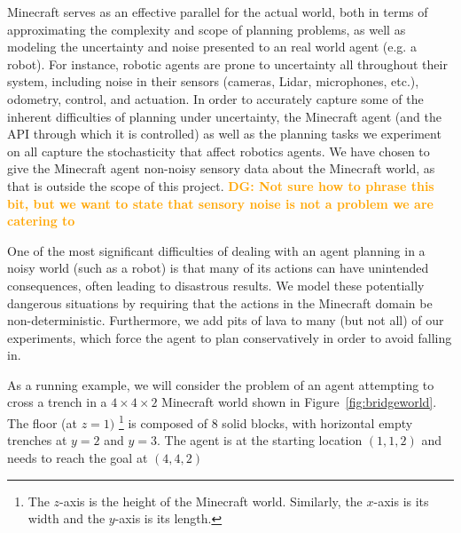\documentclass[]{article}
\newcommand{\dgnote}[1]{\textcolor{Orange}{\textbf{DG: #1}}}
\begin{document}
Minecraft serves as an effective parallel for the actual world, both in terms of
approximating the complexity and scope of planning problems,
as well as modeling the uncertainty and noise presented to an real world agent (e.g. a robot).
For instance, robotic agents are prone to uncertainty all throughout their system, including noise in their sensors
(cameras, Lidar, microphones, etc.), odometry, control, and actuation.
In order to accurately capture some of the inherent difficulties of planning under
uncertainty, the Minecraft agent (and the API through which it is controlled) as well as
the planning tasks we experiment on all capture the stochasticity that affect robotics agents.
We have chosen to give the Minecraft agent non-noisy sensory 
data about the Minecraft world, as that is outside the scope of this project. \dgnote{Not sure how to phrase this bit,
but we want to state that sensory noise is not a problem we are catering to}

One of the most significant difficulties of dealing with an agent planning in a noisy world (such as a robot) is that many of its actions
can have unintended consequences, often leading to disastrous results. We
model these potentially dangerous situations by requiring that the actions in the
Minecraft domain be non-deterministic. Furthermore, we add pits of lava to many (but not all)
of our experiments, which force the agent to plan conservatively in order to avoid
falling in.

As a running example, we will consider the problem of an agent attempting
to cross a trench in a $4 \times 4 \times 2$ Minecraft world shown in
Figure~\ref{fig:bridgeworld}. The floor (at $z = 1)$ \footnote{The
  $z$-axis is the height of the Minecraft world. Similarly, the
  $x$-axis is its width and the $y$-axis is its length.} is composed
of 8 solid blocks, with horizontal empty trenches at $y = 2$ and $y =
3$. The agent is at the starting location $(1, 1, 2)$ and needs to
reach the goal at $(4,4,2)$
\end{document}
